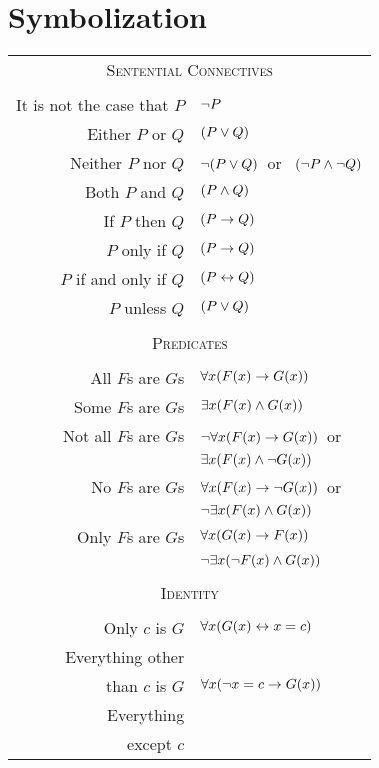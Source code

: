 \section{Symbolization}
\begin{center}
\label{app.symbolization}
\begin{tabular*}{\textwidth}{rl}
\multicolumn{2}{c}{\textsc{Sentential Connectives}}\\ \\
It is not the case that $P$ & $\neg P$\\
Either $P$ or $Q$ & $(P \vee Q)$\\
Neither $P$ nor $Q$ & $\neg(P \vee Q)$\ or \ $(\neg P \wedge \neg Q)$\\
Both $P$ and $Q$ & $(P \wedge Q)$\\
If $P$ then $Q$ & $(P \rightarrow Q)$\\
$P$ only if $Q$ & $(P \rightarrow Q)$\\
$P$ if and only if $Q$ & $(P \leftrightarrow Q)$\\
$P$ unless $Q$ & $(P \vee Q)$\\
\\
\multicolumn{2}{c}{\label{SymbolizingPredicates}\textsc{Predicates}}\\ \\
All $F$s are $G$s & $\forall x(\mathord{F}(x) \rightarrow \mathord{G}(x))$\\
Some $F$s are $G$s & $\exists x(\mathord{F}(x) \wedge \mathord{G}(x))$\\
Not all $F$s are $G$s & $\neg\forall x(\mathord{F}(x) \rightarrow \mathord{G}(x))$\ or\\
& $\exists x(\mathord{F}(x) \wedge \neg \mathord{G}(x))$\\
No $F$s are $G$s & $\forall x(\mathord{F}(x) \rightarrow\neg \mathord{G}(x))$\ or\\
& $\neg\exists x(\mathord{F}(x) \wedge \mathord{G}(x))$\\
Only $F$s are $G$s & $\forall x(\mathord{G}(x) \rightarrow \mathord{F}(x))$\\
& $\neg\exists x(\neg\mathord{F}(x) \wedge \mathord{G}(x))$\\
\\
\multicolumn{2}{c}{\textsc{Identity}}\\ \\
Only $c$ is $G$ & $\forall x(\mathord{G}(x) \leftrightarrow x=c)$\\
Everything other &\\ than $c$ 
is $G$ & $\forall x(\neg x = c \rightarrow \mathord{G}(x) )$\\
Everything \\except $c$ 

\end{tabular*}
\end{center}
